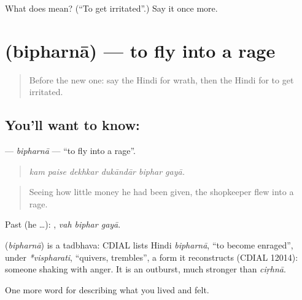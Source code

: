 \begin{tcolorbox}[breakable,colback=teal!4,colframe=teal!35!black,title={Before you move on}]
What does  mean? (\textquotedblleft{}To get irritated\textquotedblright{}.) Say it once more.
\end{tcolorbox}
\section[\texorpdfstring{\hi{बिफरना} (bipharnā)}{बिफरना (bipharnā)}]{ (bipharnā) — to fly into a rage}

\label{lesson:HI-C456-bipharna}



\begin{quote}
Before the new one: say the Hindi for wrath, then the Hindi for to get irritated.
\end{quote}

\subsection*{You'll want to know: }
\textbf{} — \emph{bipharnā} — \textquotedblleft{}to fly into a rage\textquotedblright{}.

\begin{quote}
     
\end{quote}

\begin{quote}
\emph{kam paise dekhkar dukāndār biphar gayā.}
\end{quote}

\begin{quote}
Seeing how little money he had been given, the shopkeeper flew into a rage.
\end{quote}

Past (he …):   , \emph{vah biphar gayā}.

\begin{cousinweb}
\textbf{} (\emph{bipharnā}) is a tadbhava: CDIAL lists Hindi \emph{bipharnā}, \textquotedblleft{}to become enraged\textquotedblright{}, under \emph{*vispharati}, \textquotedblleft{}quivers, trembles\textquotedblright{}, a form it reconstructs (CDIAL 12014): someone shaking with anger. It is an outburst, much stronger than \emph{ciṛhnā}.
\end{cousinweb}

\begin{grammarlens}[title={What you've built}]
One more word for describing what you lived and felt.
\end{grammarlens}

